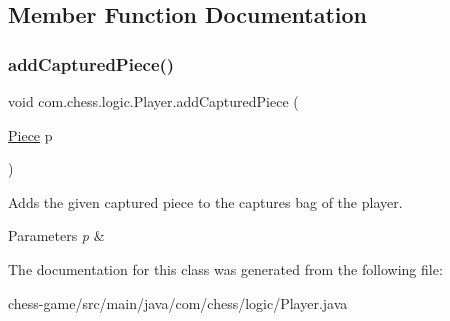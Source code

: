 \subsection{Member Function Documentation}
\mbox{\label{classcom_1_1chess_1_1logic_1_1_player_a7da022049a5be05d78805f669ae083bd}} 
\subsubsection{\texorpdfstring{addCapturedPiece()}{addCapturedPiece()}}
{\footnotesize\ttfamily void com.\+chess.\+logic.\+Player.\+add\+Captured\+Piece (\begin{DoxyParamCaption}\item[{\mbox{\hyperlink{classcom_1_1chess_1_1pieces_1_1_piece}{Piece}}}]{p }\end{DoxyParamCaption})\hspace{0.3cm}{\ttfamily [inline]}}

Adds the given captured piece to the captures bag of the player. 
\begin{DoxyParams}{Parameters}
{\em p} & \\
\hline
\end{DoxyParams}


The documentation for this class was generated from the following file\+:\begin{DoxyCompactItemize}
\item 
chess-\/game/src/main/java/com/chess/logic/Player.\+java\end{DoxyCompactItemize}
